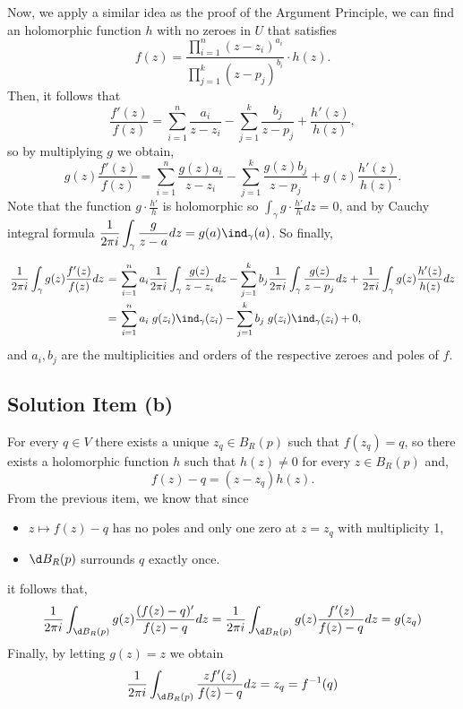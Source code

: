Now, we apply a similar idea as the proof of the Argument Principle, we can find an holomorphic function $h$ with no zeroes in $U$ that satisfies
\[ f(z) = \frac{\prod_{i = 1}^{n} (z-z_i)^{a_i}}{\prod_{j = 1}^{k} (z-p_j)^{b_i}} \cdot h(z). \]
Then, it follows that
\[ \frac{f'(z)}{f(z)} = \sum_{i = 1}^n \frac{a_i}{z-z_i} - \sum_{j = 1}^{k} \frac{b_j}{z-p_j} + \frac{h'(z)}{h(z)}, \]
so by multiplying $g$ we obtain,
\[ g(z)\frac{f'(z)}{f(z)} = \sum_{i = 1}^n \frac{g(z)a_i}{z-z_i} - \sum_{j = 1}^{k} \frac{g(z)b_j}{z-p_j} + g(z)\frac{h'(z)}{h(z)}. \]
Note that the function $\displaystyle g\cdot\frac{h'}{h}$ is holomorphic so $\displaystyle \int_\gamma g\cdot\frac{h'}{h} dz = 0$, and by Cauchy integral formula $\displaystyle \frac{1}{2\pi i}\int_\gamma \frac{g}{z-a} dz = g(a) \ind_\gamma(a)$. So finally,
\[ \everymath{\displaystyle}
\arraycolsep=1.8pt\def\arraystretch{2.5}
\begin{array}{rcl}
    \frac{1}{2\pi i}  \int_\gamma g(z)\frac{f'(z)}{f(z)} dz & = & \sum_{i = 1}^n a_i \frac{1}{2\pi i}\int_\gamma \frac{g(z)}{z-z_i} dz- \sum_{j = 1}^{k} b_j \frac{1}{2\pi i} \int_\gamma\frac{g(z)}{z-p_j}dz + \frac{1}{2\pi i} \int_\gamma g(z)\frac{h'(z)}{h(z)} dz\\
    & = & \sum_{i = 1}^n a_i\; g(z_i) \ind_{\gamma}(z_i) - \sum_{j = 1}^{k} b_j\; g(z_i) \ind_{\gamma}(z_i) + 0,
\end{array} \]
and $a_i,b_j$ are the multiplicities and orders of the respective zeroes and poles of $f$.

\subsection*{Solution Item (b)}

For every $q \in V$ there exists a unique $z_q \in B_R(p)$ such that $f(z_q) = q$, so there exists a holomorphic function $h$ such that $h(z) \neq 0$ for every $z \in B_R(p)$ and,
\[ f(z)-q = (z-z_q)h(z). \]
From the previous item, we know that since
\begin{itemize}
    \item $z\mapsto f(z)-q$ has no poles and only one zero at $z = z_q$ with multiplicity 1,
    \item $\d B_R(p)$ surrounds $q$ exactly once.
\end{itemize}
it follows that,
\[ \frac{1}{2\pi i} \int_{\d B_R(p)} g(z)\frac{(f(z)-q)'}{f(z)-q} dz = \frac{1}{2\pi i}\int_{\d B_R(p)} g(z)\frac{f'(z)}{f(z)-q} dz = g(z_q) \]
Finally, by letting $g(z) = z$ we obtain
\[ \frac{1}{2\pi i}\int_{\d B_R(p)} \frac{z f'(z)}{f(z)-q} dz = z_q = f^{-1}(q) \]